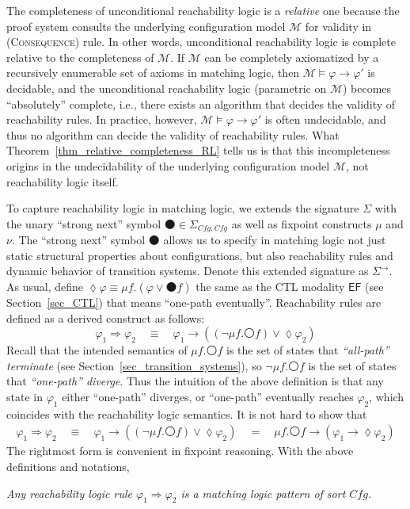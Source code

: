 \documentclass[acmsmall,review,anonymous]{acmart}
\newcommand{\imp}{\to}
\newcommand{\To}{\Rightarrow}
\newcommand{\sig}{\mathbb{\Sigma}}
\newcommand{\MM}{\mathcal{M}}
\newcommand{\prule}[1]{\textsc{(#1)}}
\newcommand{\Cfg}{\mathit{Cfg}}
\newcommand{\wnext}{{\medcirc}}
\newcommand{\snext}{{\medbullet}}
\newcommand{\eventually}{{\lozenge}}
\newcommand{\EF}{{\mathsf{EF}}}
\begin{document}
The completeness of unconditional reachability logic
is a \emph{relative} one 
because the proof system consults the underlying configuration model $\MM$
for validity in \prule{Consequence} rule.
In other words, unconditional reachability logic is complete
relative to the completeness of $\MM$.
If $\MM$ can be completely axiomatized by a recursively enumerable
set of axioms in matching logic,
then $\MM \vDash \varphi \imp \varphi'$ is decidable,
and the unconditional reachability logic 
(parametric on $\MM$) becomes ``absolutely'' complete, i.e.,
there exists an algorithm that decides the validity of 
reachability rules.
In practice, however, $\MM \vDash \varphi \imp \varphi'$ is often undecidable,
and thus no algorithm can decide the validity of reachability rules.
What Theorem~\ref{thm_relative_completeness_RL} tells us is that
this incompleteness origins in the undecidability of the underlying
configuration model $\MM$, not reachability logic itself.

To capture reachability logic in matching logic, we extends the signature $\sig$
with the unary ``strong next'' symbol $\snext \in \Sigma_{\Cfg,\Cfg}$ 
as well as fixpoint constructs $\mu$ and $\nu$.
The ``strong next'' symbol $\snext$ allows us to specify in matching logic
not just static structural properties about configurations,
but also reachability rules and dynamic behavior of
transition systems.
Denote this extended signature as $\sig^\to$.
As usual, define $\eventually \varphi \equiv \mu f . (\varphi \vee \snext f)$
the same as the CTL modality $\EF$ (see Section~\ref{sec_CTL})
that means ``one-path eventually''.
Reachability rules are defined as a derived construct as follows:
$$
\varphi_1 \To \varphi_2 \quad\equiv\quad
\varphi_1 \imp ((\neg \mu f . \wnext f) \vee \eventually \varphi_2)
$$
Recall that the intended semantics of 
$\mu f . \wnext f$ is the set of states that \emph{``all-path'' terminate}
(see Section~\ref{sec_transition_systems}),
so $\neg \mu f . \wnext f$ is the set of states that 
\emph{``one-path'' diverge}.
Thus the intuition of the above definition is that
any state in $\varphi_1$ either ``one-path'' diverges, or 
``one-path'' eventually reaches $\varphi_2$,
which coincides with the reachability logic semantics.
It is not hard to show that
\begin{align*}
\varphi_1 \To \varphi_2 \quad\equiv\quad
\varphi_1 \imp ((\neg \mu f . \wnext f) \vee \eventually \varphi_2)
\quad=\quad \mu f . \wnext f \imp (\varphi_1 \imp \eventually \varphi_2)
\end{align*}
The rightmost form is convenient in fixpoint reasoning.
With the above definitions and notations,
\begin{center}
\em
Any reachability logic rule $\varphi_1 \To \varphi_2$
is a matching logic pattern of sort $\Cfg$.
\end{center}
\end{document}
